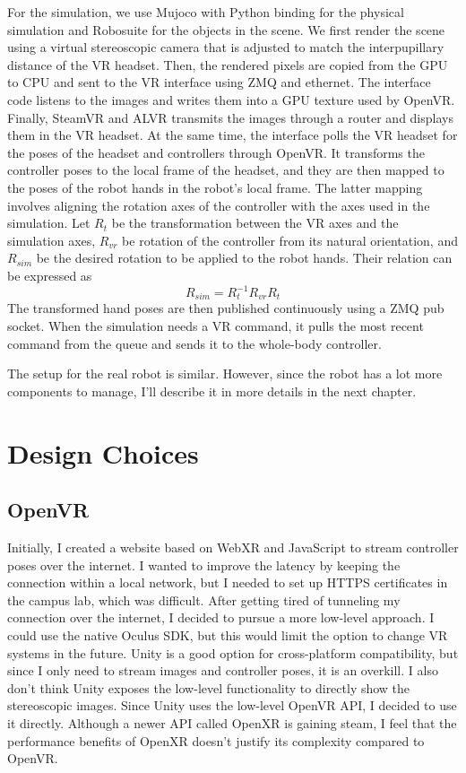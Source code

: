 For the simulation, we use Mujoco with Python binding for the physical simulation and Robosuite for the objects in the scene. We first render the scene using a virtual stereoscopic camera that is adjusted to match the interpupillary distance of the VR headset. Then, the rendered pixels are copied from the GPU to CPU and sent to the VR interface using ZMQ and ethernet. The interface code listens to the images and writes them into a GPU texture used by OpenVR. Finally, SteamVR and ALVR transmits the images through a router and displays them in the VR headset. At the same time, the interface polls the VR headset for the poses of the headset and controllers through OpenVR. It transforms the controller poses to the local frame of the headset, and they are then mapped to the poses of the robot hands in the robot's local frame. The latter mapping involves aligning the rotation axes of the controller with the axes used in the simulation. Let $R_t$ be the transformation between the VR axes and the simulation axes, $R_{vr}$ be rotation of the controller from its natural orientation, and $R_{sim}$ be the desired rotation to be applied to the robot hands. Their relation can be expressed as 
$$
R_{sim} = R_t^{-1} R_{vr} R_t
$$
The transformed hand poses are then published continuously using a ZMQ pub socket. When the simulation needs a VR command, it pulls the most recent command from the queue and sends it to the whole-body controller. 

The setup for the real robot is similar. However, since the robot has a lot more components to manage, I'll describe it in more details in the next chapter.

\section{Design Choices}

\subsection{OpenVR}

Initially, I created a website based on WebXR and JavaScript to stream controller poses over the internet. I wanted to improve the latency by keeping the connection within a local network, but I needed to set up HTTPS certificates in the campus lab, which was difficult. After getting tired of tunneling my connection over the internet, I decided to pursue a more low-level approach. 
I could use the native Oculus SDK, but this would limit the option to change VR systems in the future. Unity is a good option for cross-platform compatibility, but since I only need to stream images and controller poses, it is an overkill. I also don't think Unity exposes the low-level functionality to directly show the stereoscopic images. Since Unity uses the low-level OpenVR API, I decided to use it directly. Although a newer API called OpenXR is gaining steam, I feel that the performance benefits of OpenXR doesn't justify its complexity compared to OpenVR. 

